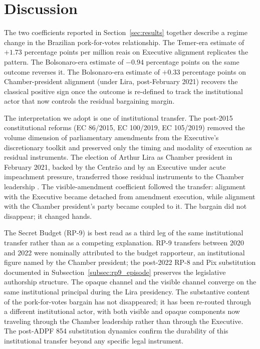 \documentclass[pdflatex,sn-basic]{sn-jnl}
\begin{document}
\section{Discussion}
\label{sec:discussion}

The two coefficients reported in Section~\ref{sec:results} together describe a regime change in the Brazilian pork-for-votes relationship. The Temer-era estimate of $+1.73$ percentage points per million reais on Executive alignment replicates the \citet{PereiraAndMueller2004} pattern. The Bolsonaro-era estimate of $-0.94$ percentage points on the same outcome reverses it. The Bolsonaro-era estimate of $+0.33$ percentage points on Chamber-president alignment (under Lira, post-February 2021) recovers the classical positive sign once the outcome is re-defined to track the institutional actor that now controls the residual bargaining margin.

The interpretation we adopt is one of institutional transfer. The post-2015 constitutional reforms (EC 86/2015, EC 100/2019, EC 105/2019) removed the volume dimension of parliamentary amendments from the Executive's discretionary toolkit and preserved only the timing and modality of execution as residual instruments. The election of Arthur Lira as Chamber president in February 2021, backed by the Centr\~ao and by an Executive under acute impeachment pressure, transferred those residual instruments to the Chamber leadership \citep{GrazianeEtAl2022RP9,BrazilReports2022SecretBudget,TCU2022RelatorioContas}. The visible-amendment coefficient followed the transfer: alignment with the Executive became detached from amendment execution, while alignment with the Chamber president's party became coupled to it. The bargain did not disappear; it changed hands.

The Secret Budget (RP-9) is best read as a third leg of the same institutional transfer rather than as a competing explanation. RP-9 transfers between 2020 and 2022 were nominally attributed to the budget rapporteur, an institutional figure named by the Chamber president; the post-2022 RP-8 and Pix substitution documented in Subsection~\ref{subsec:rp9_episode} preserves the legislative authorship structure. The opaque channel and the visible channel converge on the same institutional principal during the Lira presidency. The substantive content of the pork-for-votes bargain has not disappeared; it has been re-routed through a different institutional actor, with both visible and opaque components now traveling through the Chamber leadership rather than through the Executive. The post-ADPF 854 substitution dynamics confirm the durability of this institutional transfer beyond any specific legal instrument.
\end{document}
